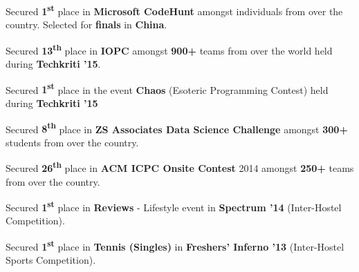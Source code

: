 \documentclass[a4paper]{norm-resume}
\begin{document}
\begin{tightitemize}
	\item Secured \textbf{1\textsuperscript{st}} place in \textbf{Microsoft CodeHunt} amongst individuals from over the country. Selected for \textbf{finals} in \textbf{China}.
	\item Secured \textbf{13\textsuperscript{th}} place in \textbf{IOPC} amongst \textbf{900+} teams from over the world held during \textbf{Techkriti '15}.
	\item Secured \textbf{1\textsuperscript{st}} place in the event \textbf{Chaos} (Esoteric Programming Contest) held during \textbf{Techkriti '15}
	\item Secured \textbf{8\textsuperscript{th}} place in \textbf{ZS Associates Data Science Challenge} amongst \textbf{300+} students from over the country.
	\item Secured \textbf{26\textsuperscript{th}} place in \textbf{ACM ICPC Onsite Contest} 2014 amongst \textbf{250+} teams from over the country.
	\item Secured \textbf{1\textsuperscript{st}} place in \textbf{Reviews} - Lifestyle event in \textbf{Spectrum '14} (Inter-Hostel Competition).\\
	\item Secured \textbf{1\textsuperscript{st}} place in \textbf{Tennis (Singles)} in \textbf{Freshers' Inferno '13} (Inter-Hostel Sports Competition).
\end{tightitemize}
\end{document}
